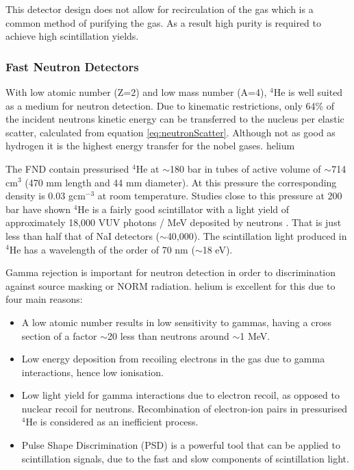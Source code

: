 This detector design does not allow for recirculation of the gas which is a common method of purifying the gas. As a result high purity is required to achieve high scintillation yields. 

\subsubsection{Fast Neutron Detectors}
With low atomic number (Z=2) and low mass number (A=4), $^{4}$He is well suited as a medium for neutron detection. Due to kinematic restrictions, only 64\% of the incident neutrons kinetic energy can be transferred to the nucleus per elastic scatter, calculated from equation \ref{eq:neutronScatter}. Although not as good as hydrogen it is the highest energy transfer for the nobel gases. helium

The FND contain pressurised $^{4}$He at $\sim$180 bar in tubes of active volume of $\sim$714 cm$^{3}$ (470 mm length and 44 mm diameter). At this pressure the corresponding density is 0.03 gcm$^{-3}$ at room temperature. Studies close to this pressure at 200 bar have shown $^{4}$He is a fairly good scintillator with a light yield of approximately 18,000 VUV photons / MeV deposited by neutrons \cite{helium4Detectors} \cite{knollRadiation}. That is just less than half that of NaI detectors ($\sim$40,000). The scintillation light produced in $^{4}$He has a wavelength of the order of 70 nm ($\sim$18 eV).

Gamma rejection is important for neutron detection in order to discrimination against source masking or NORM radiation. helium is excellent for this due to four main reasons:

\begin{itemize}
	\item A low atomic number results in low sensitivity to gammas, having a cross section of a factor $\sim$20 less than neutrons around $\sim$1 MeV. 
	\item Low energy deposition from recoiling electrons in the gas due to gamma interactions, hence low ionisation.
	\item Low light yield for gamma interactions due to electron recoil, as opposed to nuclear recoil for neutrons. Recombination of electron-ion pairs in pressurised $^{4}$He is considered as an inefficient process.
	\item Pulse Shape Discrimination (PSD) is a powerful tool that can be applied to scintillation signals, due to the fast and slow components of scintillation light.
\end{itemize}

